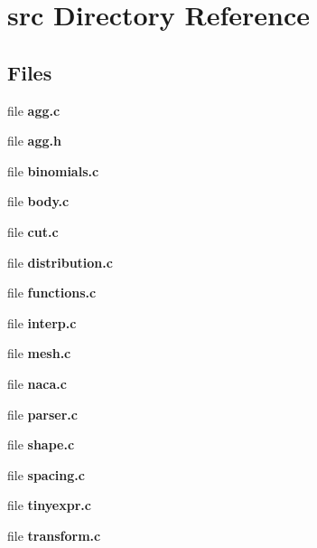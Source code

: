 \section{src Directory Reference}
\label{dir_68267d1309a1af8e8297ef4c3efbcdba}
\subsection*{Files}
\begin{DoxyCompactItemize}
\item 
file {\bfseries agg.\+c}
\item 
file {\bfseries agg.\+h}
\item 
file {\bfseries binomials.\+c}
\item 
file {\bfseries body.\+c}
\item 
file {\bfseries cut.\+c}
\item 
file {\bfseries distribution.\+c}
\item 
file {\bfseries functions.\+c}
\item 
file {\bfseries interp.\+c}
\item 
file {\bfseries mesh.\+c}
\item 
file {\bfseries naca.\+c}
\item 
file {\bfseries parser.\+c}
\item 
file {\bfseries shape.\+c}
\item 
file {\bfseries spacing.\+c}
\item 
file {\bfseries tinyexpr.\+c}
\item 
file {\bfseries transform.\+c}
\end{DoxyCompactItemize}
